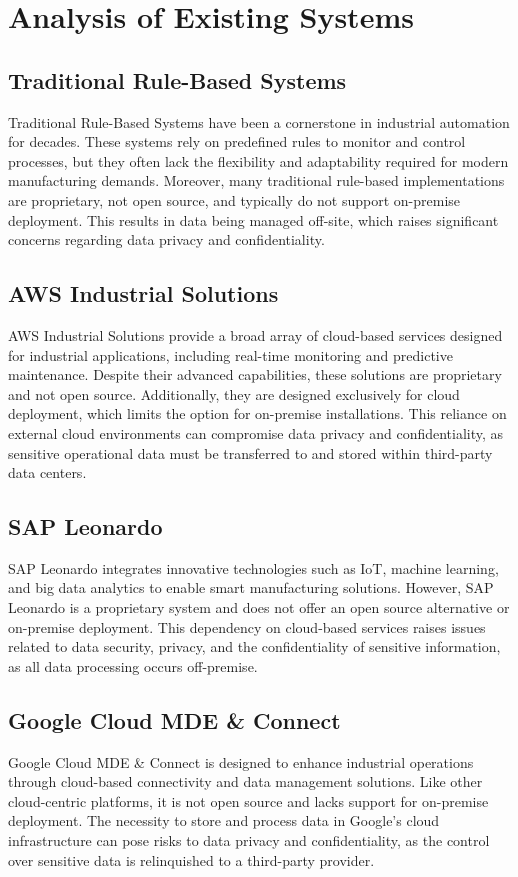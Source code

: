 \chapter{Analysis of Existing Systems}
\label{chap:existing_systems}
\setlength{\parskip}{1em}

\section{Traditional Rule-Based Systems}
Traditional Rule-Based Systems have been a cornerstone in industrial automation for decades. \cite{costa-2023} These systems rely on predefined rules to monitor and control processes, but they often lack the flexibility and adaptability required for modern manufacturing demands. Moreover, many traditional rule-based implementations are proprietary, not open source, and typically do not support on-premise deployment. This results in data being managed off-site, which raises significant concerns regarding data privacy and confidentiality.

\section{AWS Industrial Solutions}
AWS Industrial Solutions provide a broad array of cloud-based services designed for industrial applications, including real-time monitoring and predictive maintenance. \cite{aws-2025} Despite their advanced capabilities, these solutions are proprietary and not open source. Additionally, they are designed exclusively for cloud deployment, which limits the option for on-premise installations. This reliance on external cloud environments can compromise data privacy and confidentiality, as sensitive operational data must be transferred to and stored within third-party data centers.

\section{SAP Leonardo}
SAP Leonardo integrates innovative technologies such as IoT, machine learning, and big data analytics to enable smart manufacturing solutions. \cite{sap-2024} However, SAP Leonardo is a proprietary system and does not offer an open source alternative or on-premise deployment. This dependency on cloud-based services raises issues related to data security, privacy, and the confidentiality of sensitive information, as all data processing occurs off-premise.

\section{Google Cloud MDE \& Connect}
Google Cloud MDE \& Connect is designed to enhance industrial operations through cloud-based connectivity and data management solutions. \cite{rao-2024} Like other cloud-centric platforms, it is not open source and lacks support for on-premise deployment. The necessity to store and process data in Google’s cloud infrastructure can pose risks to data privacy and confidentiality, as the control over sensitive data is relinquished to a third-party provider.


